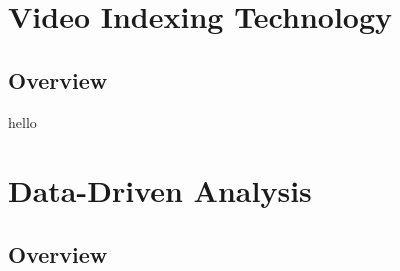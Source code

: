 \section{Video Indexing Technology}
\subsection{Overview}
hello

\section{Data-Driven Analysis}
\subsection{Overview}
